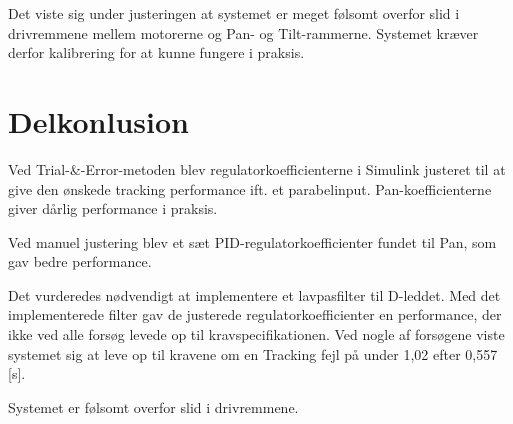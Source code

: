 Det viste sig under justeringen at systemet er meget følsomt overfor slid i drivremmene mellem motorerne og Pan- og Tilt-rammerne.
Systemet kræver derfor kalibrering for at kunne fungere i praksis.

\section{Delkonlusion}
Ved Trial-\&-Error-metoden blev regulatorkoefficienterne i Simulink justeret til at give den ønskede 
tracking performance ift. et parabelinput. Pan-koefficienterne giver dårlig performance i praksis.

Ved manuel justering blev et sæt PID-regulatorkoefficienter fundet til Pan, som gav bedre performance.

Det vurderedes nødvendigt at implementere et lavpasfilter til D-leddet.
Med det implementerede filter gav de justerede regulatorkoefficienter en performance,
der ikke ved alle forsøg levede op til kravspecifikationen. Ved nogle af forsøgene viste
systemet sig at leve op til kravene om en Tracking fejl på under 1,02 \degree{} efter 0,557 [s].

Systemet er følsomt overfor slid i drivremmene.